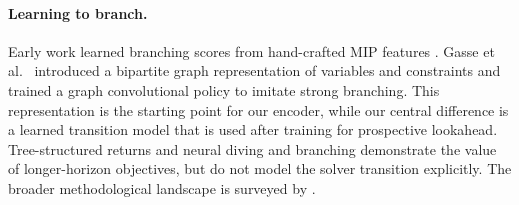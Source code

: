 \documentclass{article}
\begin{document}




\paragraph{Learning to branch.}
Early work learned branching scores from hand-crafted MIP features \citep{khalil2016learning}. Gasse et al.~\citep{gasse2019exact} introduced a bipartite graph representation of variables and constraints and trained a graph convolutional policy to imitate strong branching. This representation is the starting point for our encoder, while our central difference is a learned transition model that is used after training for prospective lookahead. Tree-structured returns \citep{scavuzzo2022learning} and neural diving and branching \citep{nair2020solving} demonstrate the value of longer-horizon objectives, but do not model the solver transition explicitly. The broader methodological landscape is surveyed by \citet{bengio2021machine}.
\end{document}
